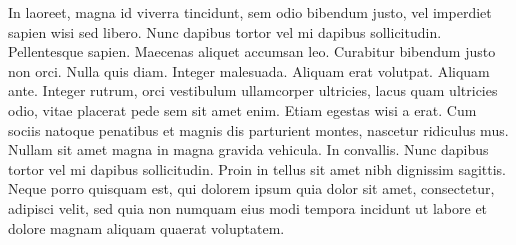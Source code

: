 In laoreet, magna id viverra tincidunt, sem odio bibendum justo, vel imperdiet sapien wisi sed libero. Nunc dapibus tortor vel mi dapibus sollicitudin. Pellentesque sapien. Maecenas aliquet accumsan leo. Curabitur bibendum justo non orci. Nulla quis diam. Integer malesuada. Aliquam erat volutpat. Aliquam ante. Integer rutrum, orci vestibulum ullamcorper ultricies, lacus quam ultricies odio, vitae placerat pede sem sit amet enim. Etiam egestas wisi a erat. Cum sociis natoque penatibus et magnis dis parturient montes, nascetur ridiculus mus. Nullam sit amet magna in magna gravida vehicula. In convallis. Nunc dapibus tortor vel mi dapibus sollicitudin. Proin in tellus sit amet nibh dignissim sagittis. Neque porro quisquam est, qui dolorem ipsum quia dolor sit amet, consectetur, adipisci velit, sed quia non numquam eius modi tempora incidunt ut labore et dolore magnam aliquam quaerat voluptatem.
